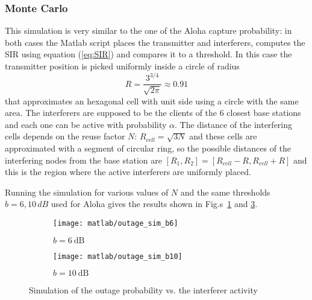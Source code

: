 \documentclass[a4paper,oneside]{article}
\begin{document}
\subsubsection*{Monte Carlo}
This simulation is very similar to the one of the Aloha capture
probability: in both cases the Matlab script places the transmitter
and interferers, computes the SIR using equation (\ref{eq:SIR}) and compares it to
a threshold.
%
In this case the transmitter position is picked uniformly inside a
circle of radius
\begin{equation}
  R=\frac{3^{3/4}}{\sqrt{2\pi}} \approx 0.91
\end{equation}
that approximates an hexagonal cell with unit side using a circle with
the same area.  The interferers are supposed to be the clients of the
6 closest base stations and each one can be active with probability
$\alpha$. The distance of the interfering cells depends on the reuse
factor $N$: $R_{cell} = \sqrt{3N}$ and these cells are approximated
with a segment of circular ring, so the possible distances of the
interfering nodes from the base station are $[R_1,R_2] = [R_{cell} -R,
  R_{cell}+R]$ and this is the region where the active interferers are
uniformly placed.

Running the simulation for various values of $N$ and the same
thresholds $b= 6, 10 \, \si{dB}$ used for Aloha gives the results
shown in Fig.s~\ref{plot:outage_sim_b6} and \ref{plot:outage_sim_b10}.
\begin{figure}[htbp]
  \centering
  \begin{subfigure}{0.5\textwidth}
    \centering
    \texttt{[image: matlab/outage\_sim\_b6]}
    \caption{$ b = \SI{6}{\dB}$}
    \label{plot:outage_sim_b6}
  \end{subfigure}%
  \begin{subfigure}{0.5\textwidth}
    \centering
    \texttt{[image: matlab/outage\_sim\_b10]}
    \caption{$ b = \SI{10}{\dB}$}
    \label{plot:outage_sim_b10}
  \end{subfigure}
  \caption{Simulation of the outage probability vs. the interferer
    activity}
\end{figure}
\end{document}
